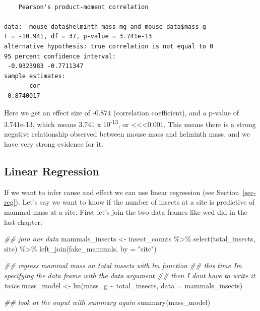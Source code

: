 \documentclass[
  letterpaper,
  DIV=11,
  numbers=noendperiod]{scrreprt}
\newenvironment{Shaded}{\begin{snugshade}}{\end{snugshade}}
\newcommand{\AttributeTok}[1]{\textcolor[rgb]{0.40,0.45,0.13}{#1}}
\newcommand{\DocumentationTok}[1]{\textcolor[rgb]{0.37,0.37,0.37}{\textit{#1}}}
\newcommand{\FunctionTok}[1]{\textcolor[rgb]{0.28,0.35,0.67}{#1}}
\newcommand{\NormalTok}[1]{\textcolor[rgb]{0.00,0.23,0.31}{#1}}
\newcommand{\OtherTok}[1]{\textcolor[rgb]{0.00,0.23,0.31}{#1}}
\newcommand{\SpecialCharTok}[1]{\textcolor[rgb]{0.37,0.37,0.37}{#1}}
\newcommand{\StringTok}[1]{\textcolor[rgb]{0.13,0.47,0.30}{#1}}
\begin{document}
\begin{verbatim}

    Pearson's product-moment correlation

data:  mouse_data$helminth_mass_mg and mouse_data$mass_g
t = -10.941, df = 37, p-value = 3.741e-13
alternative hypothesis: true correlation is not equal to 0
95 percent confidence interval:
 -0.9323983 -0.7711347
sample estimates:
       cor 
-0.8740017 
\end{verbatim}

Here we get an effect size of -0.874 (correlation coefficient), and a
p-value of 3.741e-13, which means 3.741 x 10\textsuperscript{-13}, or
\textless\textless\textless0.001. This means there is a strong negative
relationship observed between mouse mass and helminth mass, and we have
very strong evidence for it.

\subsection{Linear Regression}\label{linear-regression}

If we want to infer cause and effect we can use linear regression (see
Section~\ref{sec-reg}). Let's say we want to know if the number of
insects at a site is predictive of mammal mass at a site. First let's
join the two data frames like wed did in the last chapter:

\begin{Shaded}
\begin{Highlighting}[]
\DocumentationTok{\#\# join our data}
\NormalTok{mammals\_insects }\OtherTok{\textless{}{-}}\NormalTok{ insect\_counts }\SpecialCharTok{\%\textgreater{}\%}
  \FunctionTok{select}\NormalTok{(total\_insects, site) }\SpecialCharTok{\%\textgreater{}\%}
  \FunctionTok{left\_join}\NormalTok{(fake\_mammals, }\AttributeTok{by =} \StringTok{"site"}\NormalTok{)}

\DocumentationTok{\#\# regress mammal mass on total insects with lm function}
\DocumentationTok{\#\# this time I\textquotesingle{}m specifying the data frame with the data argument}
\DocumentationTok{\#\# then I don\textquotesingle{}t have to write it twice}
\NormalTok{mass\_model }\OtherTok{\textless{}{-}} \FunctionTok{lm}\NormalTok{(mass\_g }\SpecialCharTok{\textasciitilde{}}\NormalTok{ total\_insects, }\AttributeTok{data =}\NormalTok{ mammals\_insects)}

\DocumentationTok{\#\# look at the ouput with summary again}
\FunctionTok{summary}\NormalTok{(mass\_model)}
\end{Highlighting}
\end{Shaded}
\end{document}
